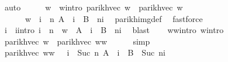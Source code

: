 \begin{isabellebody}
\ auto\isanewline
\ \ \isamarkupfalse%
\ \isamarkupfalse%
\ w{}{\isacharprime}{\kern0pt}\ \ w{}{\isacharprime}{\kern0pt}{\isacharunderscore}{\kern0pt}intro{\isacharcolon}{\kern0pt}\ {\isachardoublequoteopen}parikh{\isacharunderscore}{\kern0pt}vec\ w{}{\isacharprime}{\kern0pt}\ {\isacharequal}{\kern0pt}\ parikh{\isacharunderscore}{\kern0pt}vec\ w{}\ {\isasymand}\isanewline
\ \ \ \ \ \ w{}{\isacharprime}{\kern0pt}\ {\isasymin}\ {\isacharparenleft}{\kern0pt}{\isasymUnion}i\ {\isasymle}\ n{\isachardot}{\kern0pt}\ A\ {\isacharcircum}{\kern0pt}{\isacharcircum}{\kern0pt}\ i\ {\isacharat}{\kern0pt}{\isacharat}{\kern0pt}\ B\ {\isacharcircum}{\kern0pt}{\isacharcircum}{\kern0pt}\ {\isacharparenleft}{\kern0pt}n{\isacharminus}{\kern0pt}i{\isacharparenright}{\kern0pt}{\isacharparenright}{\kern0pt}{\isachardoublequoteclose}\ \isamarkupfalse%
\ parikh{\isacharunderscore}{\kern0pt}img{\isacharunderscore}{\kern0pt}def\ \isamarkupfalse%
\ fastforce\isanewline
\ \ \isamarkupfalse%
\ \isamarkupfalse%
\ i\ \ i{\isacharunderscore}{\kern0pt}intro{\isacharcolon}{\kern0pt}\ {\isachardoublequoteopen}i\ {\isasymle}\ n\ {\isasymand}\ w{}{\isacharprime}{\kern0pt}\ {\isasymin}\ A\ {\isacharcircum}{\kern0pt}{\isacharcircum}{\kern0pt}\ i\ {\isacharat}{\kern0pt}{\isacharat}{\kern0pt}\ B\ {\isacharcircum}{\kern0pt}{\isacharcircum}{\kern0pt}\ {\isacharparenleft}{\kern0pt}n{\isacharminus}{\kern0pt}i{\isacharparenright}{\kern0pt}{\isachardoublequoteclose}\ \isamarkupfalse%
\ blast\isanewline
\ \ \isamarkupfalse%
\ w{}{\isacharunderscore}{\kern0pt}w{}{\isacharunderscore}{\kern0pt}intro\ w{}{\isacharprime}{\kern0pt}{\isacharunderscore}{\kern0pt}intro\ \isamarkupfalse%
\ {\isachardoublequoteopen}parikh{\isacharunderscore}{\kern0pt}vec\ w\ {\isacharequal}{\kern0pt}\ parikh{\isacharunderscore}{\kern0pt}vec\ {\isacharparenleft}{\kern0pt}w{}{\isacharat}{\kern0pt}w{}{\isacharprime}{\kern0pt}{\isacharparenright}{\kern0pt}{\isachardoublequoteclose}\isanewline
\ \ \ \ \isamarkupfalse%
\ simp\isanewline
\ \ \isamarkupfalse%
\ \isamarkupfalse%
\ {\isachardoublequoteopen}parikh{\isacharunderscore}{\kern0pt}vec\ {\isacharparenleft}{\kern0pt}w{}{\isacharat}{\kern0pt}w{}{\isacharprime}{\kern0pt}{\isacharparenright}{\kern0pt}\ {\isasymin}\ {\isasymPsi}\ {\isacharparenleft}{\kern0pt}{\isasymUnion}i\ {\isasymle}\ Suc\ n{\isachardot}{\kern0pt}\ A\ {\isacharcircum}{\kern0pt}{\isacharcircum}{\kern0pt}\ i\ {\isacharat}{\kern0pt}{\isacharat}{\kern0pt}\ B\ {\isacharcircum}{\kern0pt}{\isacharcircum}{\kern0pt}\ {\isacharparenleft}{\kern0pt}Suc\ n{\isacharminus}{\kern0pt}i{\isacharparenright}{\kern0pt}{\isacharparenright}{\kern0pt}{\isachardoublequoteclose}\isanewline

\end{isabellebody}
